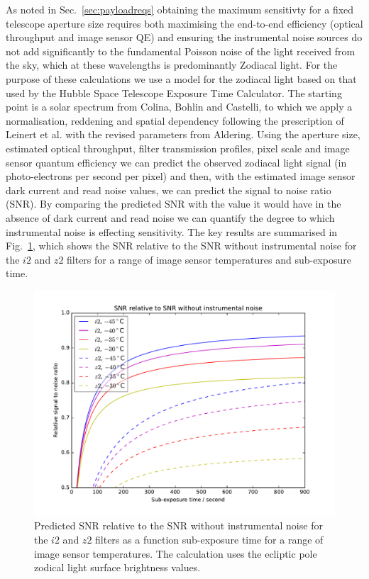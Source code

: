 \documentclass[]{iac}
\begin{document}
As noted in Sec.~\ref{sec:payloadreqs} obtaining the maximum sensitivty for a fixed telescope aperture size requires
both maximising the end-to-end efficiency (optical throughput and image sensor QE) and ensuring the instrumental noise
sources do not add significantly to the fundamental Poisson noise of the light received from the sky, which at these
wavelengths is predominantly Zodiacal light. For the purpose of these calculations we use a model for the zodiacal light
based on that used by the Hubble Space Telescope Exposure Time Calculator\cite{Giavalisco2002}. The starting point is a
solar spectrum from Colina, Bohlin and Castelli\cite{Colina1996}, to which we apply a normalisation, reddening and
spatial dependency following the prescription of Leinert et al.\cite{Leinert1998} with the revised parameters from
Aldering\cite{Aldering2001}. Using the aperture size, estimated optical throughput, filter transmission profiles, pixel
scale and image sensor quantum efficiency we can predict the observed zodiacal light signal (in photo-electrons per
second per pixel) and then, with the estimated image sensor dark current and read noise values, we can predict the
signal to noise ratio (SNR). By comparing the predicted SNR with the value it would have in the absence of dark current
and read noise we can quantify the degree to which instrumental noise is effecting sensitivity. The key results are
summarised in Fig.~\ref{fig:relsnr}, which shows the SNR relative to the SNR without instrumental noise for the $i2$ and
$z2$ filters for a range of image sensor temperatures and sub-exposure time.

\begin{figure}[htp]
  \center \includegraphics[width=\columnwidth]{figures/relsnr.pdf}
  \caption{\label{fig:relsnr}Predicted SNR relative to the SNR without instrumental noise for the $i2$ and $z2$ filters
    as a function sub-exposure time for a range of image sensor temperatures. The calculation uses the ecliptic pole
    zodical light surface brightness values.}
\end{figure}
\end{document}
